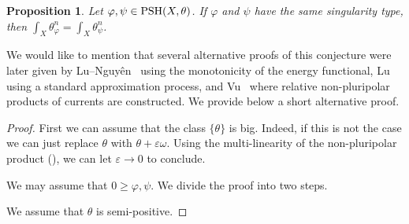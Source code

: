\documentclass[a4paper]{amsart}
\numberwithin{equation}{section}
\newtheorem{proposition}[theorem]{Proposition}
\theoremstyle{definition}
\numberwithin{equation}{section}
\newcommand{\PSH}{{\rm PSH}}
\begin{document}
\begin{proposition}\label{prop1}
Let $\varphi,\psi\in\PSH(X,\theta)$. If $\varphi$ and $\psi$ have the same singularity type, then $\int_X\theta_\varphi^n=\int_X\theta_\psi^n$.  
\end{proposition}
We would like to mention that several alternative proofs of this conjecture were later given by Lu--Nguy\^en~\cite{lu2022hessian} using the monotonicity of the energy functional, Lu~\cite{lu2021capacities} using a standard approximation process, and Vu~\cite{vu2021relative} where relative non-pluripolar products of
currents are constructed. We provide below a short alternative proof.
\begin{proof} First we  can assume that the class $\{\theta\}$ is big. Indeed, if this is not the case we can just replace $\theta$ with $\theta+\varepsilon\omega$. Using the multi-linearity
of the non-pluripolar product (\cite[Proposition 1.4]{boucksom2010monge}), we can let $\varepsilon\to 0$ to conclude. 

We may assume that $0\geq \varphi,\psi$. 
We divide the proof into two steps.

 We assume that $\theta$ is semi-positive.


\end{proof}
\end{document}
